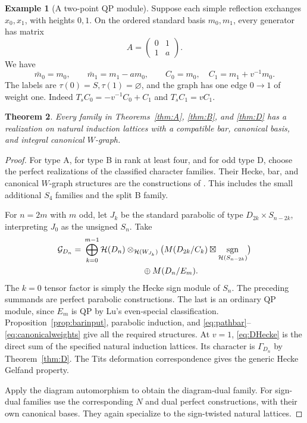 \documentclass[11pt]{article}
\numberwithin{equation}{section}
\newtheorem{theorem}{Theorem}[section]
\theoremstyle{definition}
\newtheorem{example}[theorem]{Example}
\DeclareMathOperator{\sgn}{sgn}
\newcommand{\HH}{\mathcal H}
\newcommand{\emptypar}{\varnothing}
\begin{document}
\begin{example}[A two-point QP module]
Suppose each simple reflection exchanges \(x_0,x_1\), with heights \(0,1\).
On the ordered standard basis \(m_0,m_1\), every generator has matrix
\[
 A=\begin{pmatrix}0&1\\1&a\end{pmatrix}.
\]
We have
\[
 \bar m_0=m_0,\qquad\bar m_1=m_1-am_0,\qquad
 C_0=m_0,\quad C_1=m_1+v^{-1}m_0.
\]
The labels are \(\tau(0)=S,\tau(1)=\emptypar\), and the graph has one edge \(0\to1\) of weight one.
Indeed \(T_sC_0=-v^{-1}C_0+C_1\) and \(T_sC_1=vC_1\).
\end{example}



\begin{theorem}\label{thm:naturalclassical}
Every family in Theorems~\ref{thm:A}, \ref{thm:B}, and \ref{thm:D} has a realization on natural induction lattices with a compatible bar, canonical basis, and integral canonical \(W\)-graph.
\end{theorem}
\begin{proof}
For type A, for type B in rank at least four, and for odd type D, choose the perfect realizations of the classified character families.
Their Hecke, bar, and canonical \(W\)-graph structures are the constructions of \cite{MZgraphs}.
This includes the small additional \(S_4\) families and the split B family.

For \(n=2m\) with \(m\) odd, let \(J_k\) be the standard parabolic of type \(D_{2k}\times S_{n-2k}\), interpreting \(J_0\) as the unsigned \(S_n\).
Take
\begin{equation}
\begin{split}
 \mathcal G_{D_n}
 ={}&\bigoplus_{k=0}^{m-1}
 \HH(D_n)\otimes_{\HH(W_{J_k})}
 \bigl(M(D_{2k}/C_k)\boxtimes\sgn_{\HH(S_{n-2k})}\bigr)\\
 &\hspace{25mm}\oplus M(D_n/E_m).
\end{split}
\label{eq:DHecke}
\end{equation}
The \(k=0\) tensor factor is simply the Hecke sign module of \(S_n\).
The preceding summands are perfect parabolic constructions.
The last is an ordinary QP module, since \(E_m\) is QP by Lu's even-special classification.
Proposition~\ref{prop:barinput}, parabolic induction, and
\eqref{eq:pathbar}--\eqref{eq:canonicalweights} give all the required structures.
At \(v=1\), \eqref{eq:DHecke} is the direct sum of the specified natural induction lattices.
Its character is \(\Gamma_{D_n}\) by Theorem~\ref{thm:D}.
The Tits deformation correspondence gives the generic Hecke Gelfand property.

Apply the diagram automorphism to obtain the diagram-dual family.
For sign-dual families use the corresponding \(N\) and dual perfect constructions, with their own canonical bases.
They again specialize to the sign-twisted natural lattices.
\end{proof}
\end{document}
